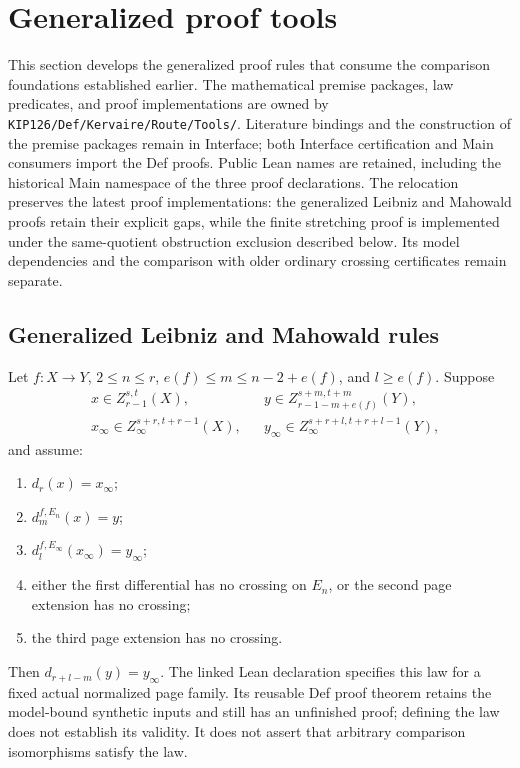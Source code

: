 \section{Generalized proof tools}
\label{chap:generalized-tools}

This section develops the generalized proof rules that consume the comparison
foundations established earlier. The mathematical premise packages, law
predicates, and proof implementations are owned by
\texttt{KIP126/Def/Kervaire/Route/Tools/}. Literature bindings and the
construction of the premise packages remain in Interface; both Interface
certification and Main consumers import the Def proofs. Public Lean names
are retained, including the historical Main namespace of the three proof
declarations. The relocation preserves the latest proof implementations:
the generalized Leibniz and Mahowald proofs retain their explicit gaps,
while the finite stretching proof is implemented under the same-quotient
obstruction exclusion described below. Its model dependencies and the
comparison with older ordinary crossing certificates remain separate.

\subsection{Generalized Leibniz and Mahowald rules}

\begin{theorem}
  \label{thm:generalized-leibniz}
  \notready
  Let $f:X\to Y$, $2\le n\le r$,
  $e(f)\le m\le n-2+e(f)$, and $l\ge e(f)$.  Suppose
  \[
  \begin{aligned}
    &x\in Z_{r-1}^{s,t}(X),&&
    y\in Z_{r-1-m+e(f)}^{s+m,t+m}(Y),\\
    &x_\infty\in Z_\infty^{s+r,t+r-1}(X),&&
    y_\infty\in Z_\infty^{s+r+l,t+r+l-1}(Y),
  \end{aligned}
  \]
  and assume:
  \begin{enumerate}
    \item $d_r(x)=x_\infty$;
    \item $d_m^{f,E_n}(x)=y$;
    \item $d_l^{f,E_\infty}(x_\infty)=y_\infty$;
    \item either the first differential has no crossing on $E_n$, or the
      second page extension has no crossing;
    \item the third page extension has no crossing.
  \end{enumerate}
  Then $d_{r+l-m}(y)=y_\infty$.
  The linked Lean declaration specifies this law for a fixed actual
  normalized page family. Its reusable Def proof theorem
  retains the model-bound synthetic inputs and still has an unfinished
  proof; defining the law does not establish its validity.
  It does not assert that arbitrary comparison isomorphisms satisfy the law.
\end{theorem}

